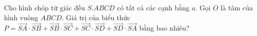 \begin{ex}
Cho hình chóp tứ giác đều $S.ABCD$ có tất cả các cạnh bằng $a$. Gọi $O$ là tâm của hình vuông $ABCD$. Giá trị của biểu thức $P=\overrightarrow{SA}\cdot\overrightarrow{SB}+\overrightarrow{SB}\cdot\overrightarrow{SC}+\overrightarrow{SC}\cdot\overrightarrow{SD}+\overrightarrow{SD}\cdot\overrightarrow{SA}$ bằng bao nhiêu?
\end{ex}
